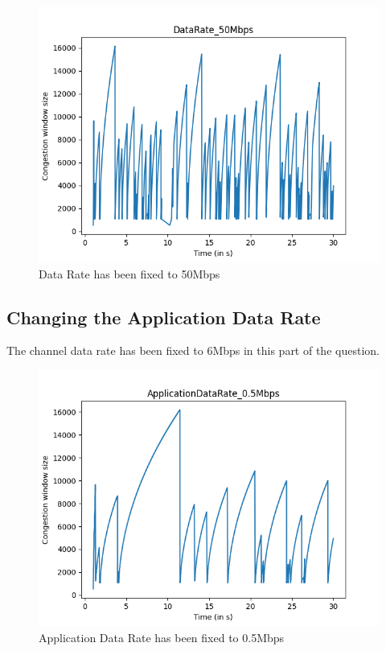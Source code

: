 \documentclass{article}
\begin{document}
\begin{figure}[H]
    \centering
    \includegraphics[scale = 0.8]{Q2/outputs/plots/DataRate_50Mbps.png}
    \caption{Data Rate has been fixed to 50Mbps}
\end{figure}




\subsection{Changing the Application Data Rate}
The channel data rate has been fixed to 6Mbps in this part of the question.

\begin{figure}[H]
    \centering
    \includegraphics[scale = 0.8]{Q2/outputs/plots/ApplicationDataRate_0.5Mbps.png}
    \caption{Application Data Rate has been fixed to 0.5Mbps}
\end{figure}
\end{document}
